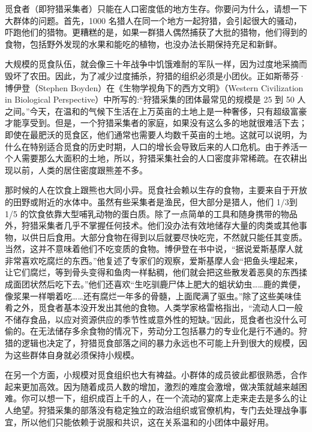 觅食者（即狩猎采集者）只能在人口密度低的地方生存。你要问为什么，请想一下大群体的问题。首先，1000 名猎人在同一个地方一起狩猎，会引起很大的骚动，吓跑他们的猎物。更糟糕的是，如果一群猎人偶然捕获了大批的猎物，他们得到的食物，包括野外发现的水果和能吃的植物，也没办法长期保持充足和新鲜。

大规模的觅食队伍，就会像三十年战争中饥饿难耐的军队一样，因为过度地采摘而毁坏了农田。因此，为了减少过度捕杀，狩猎的组织必须是小团伙。正如斯蒂芬·博伊登（Stephen Boyden）在《生物学视角下的西方文明》（Western Civilization in Biological Perspective）中所写的:“狩猎采集的团体最常见的规模是 25 到 50 人之间。”今天，在温和的气候下生活在上万英亩的土地上是一种奢侈，只有超级富豪才能享受到。但是，一个狩猎采集者的家庭，如果没有这么多的地就很难活下去；即使在最肥沃的觅食区，他们通常也需要人均数千英亩的土地。这就可以说明，为什么在特别适合觅食的历史时期，人口的增长会导致后来的人口危机。由于养活一个人需要那么大面积的土地，所以，狩猎采集社会的人口密度非常稀疏。在农耕出现以前，人类的居住密度跟熊差不多。

那时候的人在饮食上跟熊也大同小异。觅食社会赖以生存的食物，主要来自于开放的田野或附近的水体中。虽然有些采集者是渔民，但大部分是猎人，他们 1/3到 1/5 的饮食依靠大型哺乳动物的蛋白质。除了一点简单的工具和随身携带的物品外，狩猎采集者几乎不掌握任何技术。他们没办法有效地储存大量的肉类或其他事物，以供日后食用。大部分食物在得到以后就要尽快吃完，不然就只能任其变质。当然，这并不意味着他们不吃变质的食物。博伊登在书中说，“据说爱斯基摩人就非常喜欢吃腐烂的东西。”他复述了专家们的观察，爱斯基摩人会“把鱼头埋起来，让它们腐烂，等到骨头变得和鱼肉一样黏稠，他们就会把这些散发着恶臭的东西揉成面团状然后吃下去。”他们还喜欢“生吃驯鹿尸体上肥大的蛆状幼虫……鹿的粪便，像浆果一样嚼着吃……还有腐烂一年多的骨髓，上面爬满了驱虫。”除了这些美味佳肴之外，觅食者基本没开发出其他的食物。人类学家格雷格指出，“流动人口一般不储存食品，以应对资源供应的季节性或意外性的短缺。”因此，觅食者也没什么可偷的。在无法储存多余食物的情况下，劳动分工包括暴力的专业化是行不通的。狩猎的逻辑也决定了，狩猎觅食部落之间的暴力永远也不可能上升到很大的规模，因为这些群体自身就必须保持小规模。

在另一个方面，小规模对觅食组织也大有裨益。小群体的成员彼此都很熟悉，合作起来更加高效。因为随着成员人数的增加，激烈的难度会激增，做决策就越来越困难。你可以想一下，组织成百上千的人，在一个流动的宴席上走来走去是多么的让人绝望。狩猎采集的部落没有稳定独立的政治组织或官僚机构，专门去处理战争事宜，所以他们只能依赖于说服和共识，这在关系温和的小团体中最好用。

